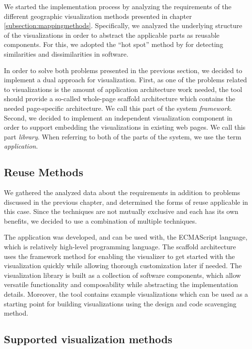 We started the implementation process by analyzing the requirements of the different geographic visualization methods presented in chapter \ref{subsection:mappingmethods}. Specifically, we analyzed the underlying structure of the visualizations in order to abstract the applicable parts as reusable components. For this, we adopted the ``hot spot'' method by \citet{schmid_systematic_1997} for detecting similarities and dissimilarities in software.

In order to solve both problems presented in the previous section, we decided to implement a dual approach for visualization. First, as one of the problems related to visualizations is the amount of application architecture work needed, the tool should provide a so-called whole-page scaffold architecture \citep{jazayeri_trends_2007} which contains the needed page-specific architecture. We call this part of the system \emph{framework}. Second, we decided to implement an independent visualization component in order to support embedding the visualizations in existing web pages. We call this part \emph{library}. When referring to both of the parts of the system, we use the term \emph{application}.

\subsection{Reuse Methods}

We gathered the analyzed data about the requirements in addition to problems discussed in the previous chapter, and determined the forms of reuse applicable in this case. Since the techniques are not mutually exclusive and each has its own benefits, we decided to use a combination of multiple techniques. 

The application was developed, and can be used with, the ECMAScript language, which is relatively high-level programming language. The scaffold architecture uses the framework method for enabling the visualizer to get started with the visualization quickly while allowing thorough customization later if needed. The visualization library is built as a collection of software components, which allow versatile functionality and composability while abstracting the implementation details. Moreover, the tool contains example visualizations which can be used as a starting point for building visualizations using the design and code scavenging method.

\subsection{Supported visualization methods}
\label{subsection:supportedvisualizationmethods}

